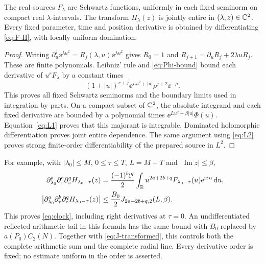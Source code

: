 \begin{proposition}\label{prop:source-regular}
The real sources \(F_\lambda\) are Schwartz functions, uniformly in
each fixed seminorm on compact real \(\lambda\)-intervals. The transform
\(H_\lambda(z)\) is jointly entire in \((\lambda,z)\in\mathbb C^2\).
Every fixed parameter, time and position derivative is obtained by
differentiating \eqref{eq:F-H}, with locally uniform domination.
\end{proposition}
\begin{proof}
Writing \(\partial_u^j\ee^{\lambda u^2}=R_j(\lambda,u)\ee^{\lambda u^2}\)
gives \(R_0=1\) and
\(R_{j+1}=\partial_uR_j+2\lambda uR_j\). These are finite polynomials.
Leibniz' rule and \eqref{eq:Phi-bound} bound each derivative of
\(u^rF_\lambda\) by a constant times
\[
 (1+|u|)^{r+j}\ee^{Lu^2+|u|}\rho^{j+2}\ee^{-\rho}.
\]
This proves all fixed Schwartz seminorms and the boundary limits used
in integration by parts. On a compact subset of \(\mathbb C^2\), the absolute
integrand and each fixed derivative are bounded by a polynomial times
\(\ee^{Lu^2+\beta|u|}\Phi(u)\). Equation~\eqref{eq:L1} proves that this
majorant is integrable. Dominated holomorphic differentiation proves joint entire
dependence. The same argument using \eqref{eq:L2} proves strong
finite-order differentiability of the prepared source in \(L^2\).
\end{proof}

For example, with \(|\lambda_0|\leq M\), \(0\leq\tau\leq T\),
\(L=M+T\) and \(|\operatorname{Im}z|\leq\beta\),
\begin{align}
 \partial_{\lambda_0}^{a}\partial_\tau^{b}\partial_z^q
 H_{\lambda_0-\tau}(z)
 &=\frac{(-1)^b\mathrm i^q}{2}\int_\mathbb R
 u^{2a+2b+q}F_{\lambda_0-\tau}(u)\mathrm e^{\mathrm i zu}\,\mathrm d u,\label{eq:mixed}\\
 \left|\partial_{\lambda_0}^{a}\partial_\tau^{b}\partial_z^q
 H_{\lambda_0-\tau}(z)\right|
 &\leq\frac{B_0}{2}J_{2a+2b+q,2}(L,\beta).\label{eq:mixed-bound}
\end{align}
This proves \eqref{eq:clock}, including right derivatives at \(\tau=0\).
An undifferentiated reflected arithmetic tail in this formula has the
same bound with \(B_0\) replaced by \(a(P_0)C_2(N)\).
Together with \eqref{eq:J-transformed}, this controls both the complete
arithmetic sum and the complete radial line. Every derivative order is
fixed; no estimate uniform in the order is asserted.

